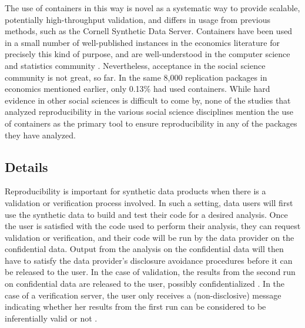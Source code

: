 \documentclass[inline]{hdsr}
\begin{document}
The use of containers in this way is novel as a systematic way to provide scalable, potentially high-throughput validation, and differs in usage from previous methods, such as the Cornell Synthetic Data Server. Containers have been used in a small number of well-published instances in the economics literature for precisely this kind of purpose, and are well-understood in the computer science and statistics community \citep{boettiger_introduction_2015,moreau_containers_2023}. Nevertheless, acceptance in the social science community  is not great, so far. In the same 8,000 replication packages in economics mentioned earlier, only 0.13\% had used containers. While hard evidence in other social sciences is difficult to come by, none of the studies that analyzed reproducibility in the various social science disciplines mention the use of containers as the primary tool to ensure reproducibility in any of the packages they have analyzed.

\subsection{Details}


Reproducibility is important for synthetic data products when there
is a validation or verification process involved. In such a setting, data users will first use the synthetic
data to build and test their code for a desired analysis. Once the user is satisfied with the code used to
perform their analysis, they can request validation or verification, and their code will be run by the data provider on the confidential data. Output from the analysis on the confidential data will then have to satisfy the data provider's disclosure avoidance procedures before it can be released to the user. In the case of validation, the results from the second run on confidential data are released to the user, possibly confidentialized \citep{u.s.censusbureauSIPPSyntheticBeta2015b}. In the case of a verification server, the user only receives a (non-disclosive) message indicating whether her results from the first run can be considered to be inferentially valid or not \citep{barrientos_providing_2018}.
\end{document}
